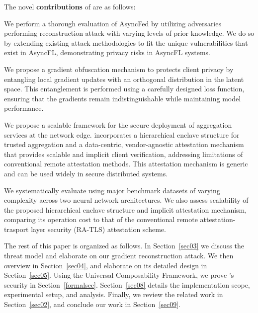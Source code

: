 The novel {\bf contributions} of \sysname are as follows: 

    We perform a thorough evaluation of AsyncFed by utilizing adversaries performing reconstruction attack with varying levels of prior knowledge. We do so by extending existing attack methodologies to fit the unique vulnerabilities that exist in AsyncFL, demonstrating privacy risks in AsyncFL systems.
    

     We propose a gradient obfuscation mechanism to protects client privacy by entangling local gradient updates with an orthogonal distribution in the latent space. This entanglement is performed using a carefully designed loss function, ensuring that the gradients remain indistinguishable while maintaining model performance. 
    
     We propose a scalable framework for the secure deployment of aggregation services at the network edge. \sysname incorporates a hierarchical enclave structure for trusted aggregation and a data-centric, vendor-agnostic attestation mechanism that provides scalable and implicit client verification, addressing limitations of conventional remote attestation methods. This attestation mechanism is generic and can be used widely in secure distributed systems. 
    

     We systematically evaluate \sysname using major benchmark datasets of varying complexity across two neural network architectures. We also assess scalability of the proposed hierarchical enclave structure and implicit attestation mechanism, comparing its operation cost to that of the conventional remote attestation-trasport layer security (RA-TLS) attestation scheme.

The rest of this paper is organized as follows. In Section~\ref{sec03} we discuss the threat model and elaborate on our gradient reconstruction attack. We then overview \sysname in Section~\ref{sec04}, and elaborate on its detailed design in Section~\ref{sec05}. Using the Universal Composability Framework, we prove \sysname's security in Section~\ref{formalsec}. Section~\ref{sec08} details the implementation scope, experimental setup, and analysis. Finally, we review the related work in Section~\ref{sec02}, and conclude our work in Section~\ref{sec09}. 







